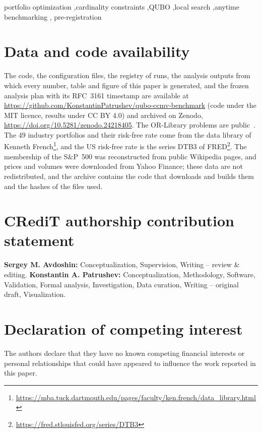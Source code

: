 \documentclass[preprint,12pt]{elsarticle}
\begin{document}
\begin{frontmatter}
\begin{keyword}
portfolio optimization \sep cardinality constraints \sep QUBO \sep local search \sep anytime benchmarking \sep
pre-registration
\end{keyword}

\end{frontmatter}










\section*{Data and code availability}
The code, the configuration files, the registry of runs, the analysis outputs from which every number, table and figure
of this paper is generated, and the frozen analysis plan with its RFC~3161 timestamp are available at
\url{https://github.com/KonstantinPatrushev/qubo-ccmv-benchmark} (code under the MIT licence, results under CC BY 4.0) %
and archived on Zenodo, \url{https://doi.org/10.5281/zenodo.24218405}. The OR-Library problems are
public~\cite{beasley1990orlibrary}. The 49 industry
portfolios and their risk-free rate come from the data library of Kenneth
French\footnote{\url{https://mba.tuck.dartmouth.edu/pages/faculty/ken.french/data_library.html}}, and the US
risk-free rate is the series DTB3 of FRED\footnote{\url{https://fred.stlouisfed.org/series/DTB3}}. The membership of
the S\&P~500 was reconstructed from public Wikipedia pages, and prices and volumes were downloaded from Yahoo Finance;
these data are not redistributed, and the archive contains the code that downloads and builds them and the hashes of
the files used.

\section*{CRediT authorship contribution statement}
\textbf{Sergey M. Avdoshin:} Conceptualization, Supervision, Writing -- review \& editing.
\textbf{Konstantin A. Patrushev:} Conceptualization, Methodology, Software, Validation, Formal analysis, Investigation,
Data curation, Writing -- original draft, Visualization.

\section*{Declaration of competing interest}
The authors declare that they have no known competing financial interests or personal relationships that could have
appeared to influence the work reported in this paper.
\end{document}
